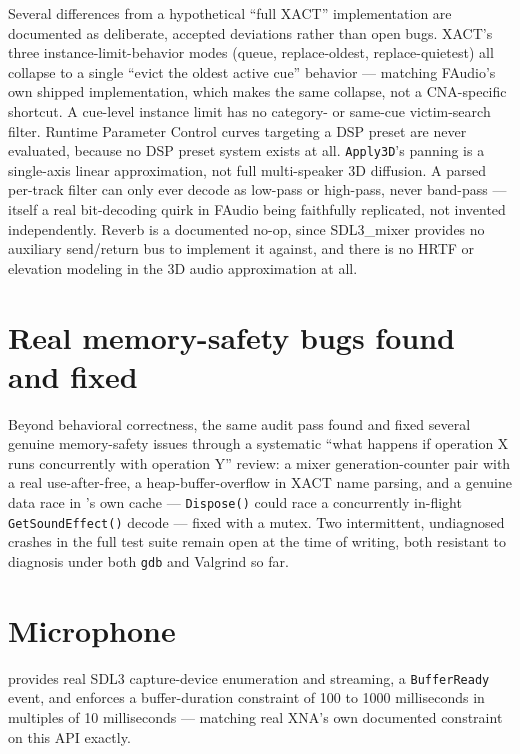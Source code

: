 Several differences from a hypothetical ``full XACT'' implementation are documented as
deliberate, accepted deviations rather than open bugs. XACT's three instance-limit-behavior
modes (queue, replace-oldest, replace-quietest) all collapse to a single ``evict the oldest
active cue'' behavior --- matching FAudio's own shipped implementation, which makes the same
collapse, not a CNA-specific shortcut. A cue-level instance limit has no category- or
same-cue victim-search filter. Runtime Parameter Control curves targeting a DSP preset are
never evaluated, because no DSP preset system exists at all. \texttt{Apply3D}'s panning is a
single-axis linear approximation, not full multi-speaker 3D diffusion. A parsed per-track
filter can only ever decode as low-pass or high-pass, never band-pass --- itself a real bit-decoding
quirk in FAudio being faithfully replicated, not invented independently. Reverb is a
documented no-op, since SDL3\_mixer provides no auxiliary send/return bus to implement it
against, and there is no HRTF or elevation modeling in the 3D audio approximation at all.

\section{Real memory-safety bugs found and fixed}

Beyond behavioral correctness, the same audit pass found and fixed several genuine
memory-safety issues through a systematic ``what happens if operation X runs concurrently
with operation Y'' review: a mixer generation-counter pair with a real use-after-free,
a heap-buffer-overflow in XACT name parsing, and a genuine data race in 's
own cache --- \texttt{Dispose()} could race a concurrently in-flight
\texttt{GetSoundEffect()} decode --- fixed with a mutex. Two intermittent, undiagnosed
crashes in the full test suite remain open at the time of writing, both resistant to
diagnosis under both \texttt{gdb} and Valgrind so far.

\section{Microphone}

 provides real SDL3 capture-device enumeration and streaming, a
\texttt{BufferReady} event, and enforces a buffer-duration constraint of 100 to 1000
milliseconds in multiples of 10 milliseconds --- matching real XNA's own documented
constraint on this API exactly.

